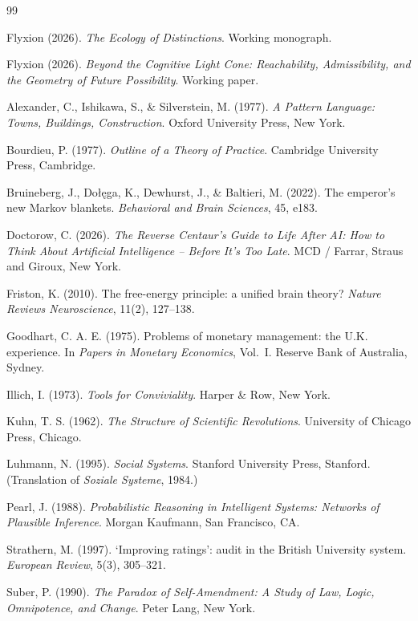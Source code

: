 \documentclass[11pt]{article}
\theoremstyle{plain}
\begin{document}
\begin{thebibliography}{99}

 Flyxion (2026). \emph{The Ecology of Distinctions}. Working monograph.

 Flyxion (2026). \emph{Beyond the Cognitive Light Cone: Reachability, Admissibility, and the Geometry of Future Possibility}. Working paper.

 Alexander, C., Ishikawa, S., \& Silverstein, M. (1977). \emph{A Pattern Language: Towns, Buildings, Construction}. Oxford University Press, New York.

 Bourdieu, P. (1977). \emph{Outline of a Theory of Practice}. Cambridge University Press, Cambridge.

 Bruineberg, J., Do\l\k{e}ga, K., Dewhurst, J., \& Baltieri, M. (2022). The emperor's new Markov blankets. \emph{Behavioral and Brain Sciences}, 45, e183.

 Doctorow, C. (2026). \emph{The Reverse Centaur's Guide to Life After AI: How to Think About Artificial Intelligence -- Before It's Too Late}. MCD / Farrar, Straus and Giroux, New York.

 Friston, K. (2010). The free-energy principle: a unified brain theory? \emph{Nature Reviews Neuroscience}, 11(2), 127--138.

 Goodhart, C. A. E. (1975). Problems of monetary management: the U.K. experience. In \emph{Papers in Monetary Economics}, Vol.\ I. Reserve Bank of Australia, Sydney.

 Illich, I. (1973). \emph{Tools for Conviviality}. Harper \& Row, New York.

 Kuhn, T. S. (1962). \emph{The Structure of Scientific Revolutions}. University of Chicago Press, Chicago.

 Luhmann, N. (1995). \emph{Social Systems}. Stanford University Press, Stanford. (Translation of \emph{Soziale Systeme}, 1984.)

 Pearl, J. (1988). \emph{Probabilistic Reasoning in Intelligent Systems: Networks of Plausible Inference}. Morgan Kaufmann, San Francisco, CA.

 Strathern, M. (1997). `Improving ratings': audit in the British University system. \emph{European Review}, 5(3), 305--321.

 Suber, P. (1990). \emph{The Paradox of Self-Amendment: A Study of Law, Logic, Omnipotence, and Change}. Peter Lang, New York.

\end{thebibliography}
\end{document}

